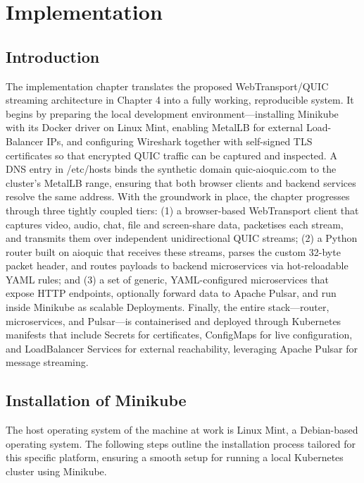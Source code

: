 \chapter{Implementation}

\section{Introduction}
The implementation chapter translates the proposed WebTransport/QUIC streaming architecture in Chapter 4 into a fully working, reproducible system. It begins by preparing the local development environment—installing Minikube \cite{minikube-docs} with its Docker driver on Linux Mint, enabling MetalLB \cite{metallb-docs} for external Load-Balancer IPs, and configuring Wireshark \cite{wireshark-docs} together with self-signed TLS certificates so that encrypted QUIC traffic can be captured and inspected. A DNS entry in /etc/hosts binds the synthetic domain quic-aioquic.com to the cluster’s MetalLB range, ensuring that both browser clients and backend services resolve the same address. With the groundwork in place, the chapter progresses through three tightly coupled tiers: (1) a browser-based WebTransport client that captures video, audio, chat, file and screen-share data, packetises each stream, and transmits them over independent unidirectional QUIC streams; (2) a Python router built on aioquic \cite{aioquic-repo} that receives these streams, parses the custom 32-byte packet header, and routes payloads to backend microservices via hot-reloadable YAML rules; and (3) a set of generic, YAML-configured microservices that expose HTTP endpoints, optionally forward data to Apache Pulsar, and run inside Minikube as scalable Deployments. Finally, the entire stack—router, microservices, and Pulsar—is containerised and deployed through Kubernetes manifests that include Secrets for certificates, ConfigMaps for live configuration, and LoadBalancer Services for external reachability, leveraging Apache Pulsar \cite{pulsar-helm-repo} for message streaming.


\section{Installation of Minikube}
The host operating system of the machine at work is Linux Mint, a Debian-based operating system. The following steps outline the installation process tailored for this specific platform, ensuring a smooth setup for running a local Kubernetes cluster using Minikube.

